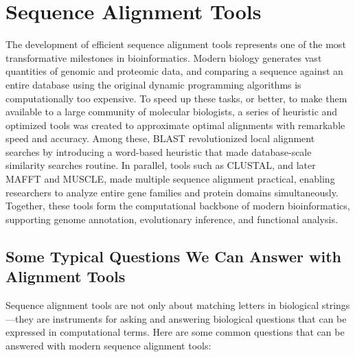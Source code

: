\chapter{Sequence Alignment Tools}
\label{ch:alignment-tools}
The development of efficient sequence alignment tools represents one of the most transformative milestones in bioinformatics. Modern biology generates vast quantities of genomic and proteomic data, and comparing a sequence against an entire database using the original dynamic programming algorithms is computationally too expensive. To speed up these tasks, or better, to make them available to a large community of molecular biologists, a series of heuristic and optimized tools was created to approximate optimal alignments with remarkable speed and accuracy. Among these, BLAST
revolutionized local alignment searches by introducing a word-based heuristic that made database-scale similarity searches routine. In parallel, tools such as CLUSTAL, and later MAFFT and MUSCLE, made multiple sequence alignment practical, enabling researchers to analyze entire gene families and protein domains simultaneously. Together, these tools form the computational backbone of modern bioinformatics, supporting genome annotation, evolutionary inference, and functional analysis.

\section{Some Typical Questions We Can Answer with Alignment Tools}

Sequence alignment tools are not only about matching letters in biological strings---they are instruments for asking and answering biological questions that can be expressed in computational terms. Here are some common questions that can be answered with modern sequence alignment tools:

